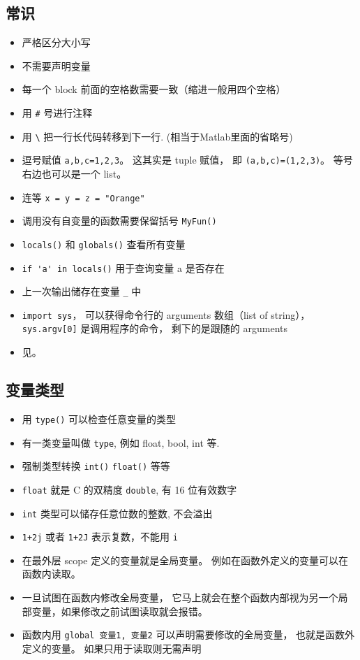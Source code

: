
\begin{issues}
\issueDraft
\end{issues}


\subsection{常识}
\begin{itemize}
\item 严格区分大小写
\item 不需要声明变量
\item 每一个 block 前面的空格数需要一致（缩进一般用四个空格）
\item 用 \verb`#` 号进行注释
\item 用 \verb`\` 把一行长代码转移到下一行. (相当于Matlab里面的省略号)
\item 逗号赋值 \verb`a,b,c=1,2,3`。 这其实是 tuple 赋值， 即 \verb`(a,b,c)=(1,2,3)`。 等号右边也可以是一个 list。
\item 连等 \verb`x = y = z = "Orange"`
\item 调用没有自变量的函数需要保留括号  \verb`MyFun()`
\item \verb`locals()` 和 \verb`globals()` 查看所有变量
\item \verb`if 'a' in locals()` 用于查询变量 a 是否存在
\item 上一次输出储存在变量 \verb`_` 中
\item \verb`import sys`， 可以获得命令行的 arguments 数组（list of string）， \verb`sys.argv[0]` 是调用程序的命令， 剩下的是跟随的 arguments
\item 见。
\end{itemize}

\subsection{变量类型}
\begin{itemize}
\item 用 \verb`type()` 可以检查任意变量的类型
\item 有一类变量叫做 \verb`type`, 例如 float, bool, int 等.
\item 强制类型转换 \verb`int()` \verb`float()` 等等
\item \verb`float` 就是 C 的双精度 \verb`double`, 有 16 位有效数字
\item \verb`int` 类型可以储存任意位数的整数, 不会溢出
\item \verb`1+2j` 或者 \verb`1+2J` 表示复数，不能用 \verb`i`
\item 在最外层 scope 定义的变量就是全局变量。 例如在函数外定义的变量可以在函数内读取。
\item 一旦试图在函数内修改全局变量， 它马上就会在整个函数内部视为另一个局部变量，如果修改之前试图读取就会报错。
\item 函数内用 \verb`global 变量1, 变量2` 可以声明需要修改的全局变量， 也就是函数外定义的变量。 如果只用于读取则无需声明
\end{itemize}

